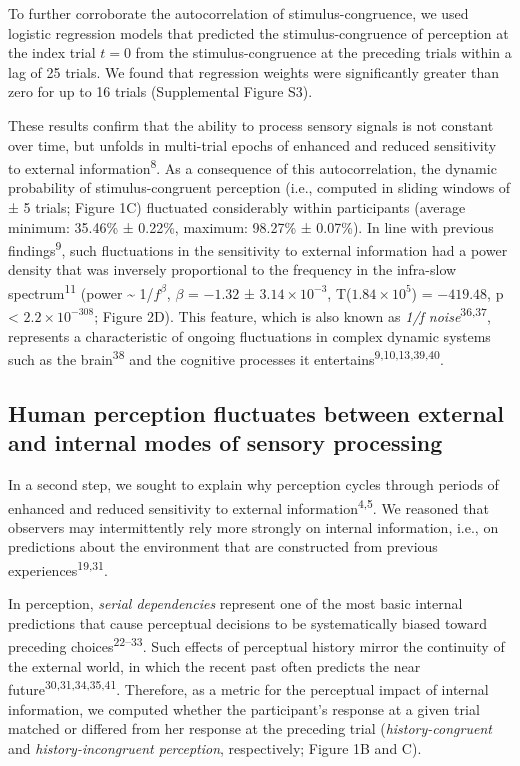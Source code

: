 \documentclass[
]{article}
\begin{document}
To further corroborate the autocorrelation of stimulus-congruence, we
used logistic regression models that predicted the stimulus-congruence
of perception at the index trial \(t = 0\) from the stimulus-congruence
at the preceding trials within a lag of 25 trials. We found that
regression weights were significantly greater than zero for up to 16
trials (Supplemental Figure S3).

These results confirm that the ability to process sensory signals is not
constant over time, but unfolds in multi-trial epochs of enhanced and
reduced sensitivity to external information\textsuperscript{8}. As a
consequence of this autocorrelation, the dynamic probability of
stimulus-congruent perception (i.e., computed in sliding windows of ± 5
trials; Figure 1C) fluctuated considerably within participants (average
minimum: 35.46\% ± 0.22\%, maximum: 98.27\% ± 0.07\%). In line with
previous findings\textsuperscript{9}, such fluctuations in the
sensitivity to external information had a power density that was
inversely proportional to the frequency in the infra-slow
spectrum\textsuperscript{11} (power \textasciitilde{} 1/\(f^\beta\),
\(\beta\) = \(-1.32\) ± \(\ensuremath{3.14\times 10^{-3}}\),
T(\(\ensuremath{1.84\times 10^{5}}\)) = \(-419.48\), p < \(\ensuremath{2.2\times 10^{-308}}\); Figure
2D). This feature, which is also known as \emph{1/f
noise}\textsuperscript{36,37}, represents a characteristic of ongoing
fluctuations in complex dynamic systems such as the
brain\textsuperscript{38} and the cognitive processes it
entertains\textsuperscript{9,10,13,39,40}.

\hypertarget{human-perception-fluctuates-between-external-and-internal-modes-of-sensory-processing}{%
\subsection{Human perception fluctuates between external and internal
modes of sensory
processing}\label{human-perception-fluctuates-between-external-and-internal-modes-of-sensory-processing}}

In a second step, we sought to explain why perception cycles through
periods of enhanced and reduced sensitivity to external
information\textsuperscript{4,5}. We reasoned that observers may
intermittently rely more strongly on internal information, i.e., on
predictions about the environment that are constructed from previous
experiences\textsuperscript{19,31}.

In perception, \emph{serial dependencies} represent one of the most
basic internal predictions that cause perceptual decisions to be
systematically biased toward preceding choices\textsuperscript{22--33}.
Such effects of perceptual history mirror the continuity of the external
world, in which the recent past often predicts the near
future\textsuperscript{30,31,34,35,41}. Therefore, as a metric for the
perceptual impact of internal information, we computed whether the
participant's response at a given trial matched or differed from her
response at the preceding trial (\emph{history-congruent} and
\emph{history-incongruent perception}, respectively; Figure 1B and C).
\end{document}
